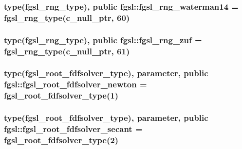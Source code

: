 \subsubsection[{fgsl\+\_\+rng\+\_\+waterman14}]{\setlength{\rightskip}{0pt plus 5cm}type({\bf fgsl\+\_\+rng\+\_\+type}), public fgsl\+::fgsl\+\_\+rng\+\_\+waterman14 = {\bf fgsl\+\_\+rng\+\_\+type}(c\+\_\+null\+\_\+ptr, 60)}\label{namespacefgsl_a47b92bfccacd568a2f9c08efbc2cb660}
\hypertarget{namespacefgsl_a43051f5642335d5741ab956a7c9cdb64}{}
\subsubsection[{fgsl\+\_\+rng\+\_\+zuf}]{\setlength{\rightskip}{0pt plus 5cm}type({\bf fgsl\+\_\+rng\+\_\+type}), public fgsl\+::fgsl\+\_\+rng\+\_\+zuf = {\bf fgsl\+\_\+rng\+\_\+type}(c\+\_\+null\+\_\+ptr, 61)}\label{namespacefgsl_a43051f5642335d5741ab956a7c9cdb64}
\hypertarget{namespacefgsl_aa05053ddddf728c909cfa5bed48b65dc}{}
\subsubsection[{fgsl\+\_\+root\+\_\+fdfsolver\+\_\+newton}]{\setlength{\rightskip}{0pt plus 5cm}type({\bf fgsl\+\_\+root\+\_\+fdfsolver\+\_\+type}), parameter, public fgsl\+::fgsl\+\_\+root\+\_\+fdfsolver\+\_\+newton = {\bf fgsl\+\_\+root\+\_\+fdfsolver\+\_\+type}(1)}\label{namespacefgsl_aa05053ddddf728c909cfa5bed48b65dc}
\hypertarget{namespacefgsl_a52cb2fcd33e5ad5b7bf7303a8b47764a}{}
\subsubsection[{fgsl\+\_\+root\+\_\+fdfsolver\+\_\+secant}]{\setlength{\rightskip}{0pt plus 5cm}type({\bf fgsl\+\_\+root\+\_\+fdfsolver\+\_\+type}), parameter, public fgsl\+::fgsl\+\_\+root\+\_\+fdfsolver\+\_\+secant = {\bf fgsl\+\_\+root\+\_\+fdfsolver\+\_\+type}(2)}\label{namespacefgsl_a52cb2fcd33e5ad5b7bf7303a8b47764a}
\hypertarget{namespacefgsl_aca4a5d84619cc9678ec442a1f33741aa}{}
